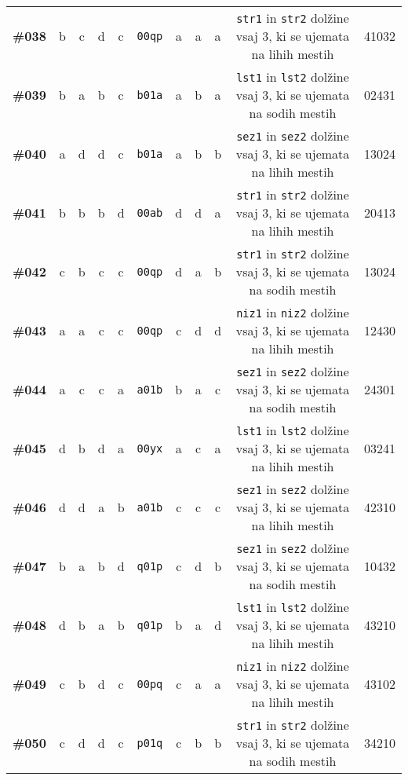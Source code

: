 \documentclass[arhiv, 10pt]{../izpit}
\newcommand{\inlinepy}[1]{\texttt{#1}}
\begin{document}
{\begin{tabular}{rcccccccccc}
\textbf{\#038} & b & c & d & c & \inlinepy{00qp} & a & a & a & 
        \inlinepy{str1} in \inlinepy{str2} dolžine vsaj 3, ki se ujemata na lihih mestih
     & 41032\\
\textbf{\#039} & b & a & b & c & \inlinepy{b01a} & a & b & a & 
        \inlinepy{lst1} in \inlinepy{lst2} dolžine vsaj 3, ki se ujemata na sodih mestih
     & 02431\\
\textbf{\#040} & a & d & d & c & \inlinepy{b01a} & a & b & b & 
        \inlinepy{sez1} in \inlinepy{sez2} dolžine vsaj 3, ki se ujemata na lihih mestih
     & 13024\\
\textbf{\#041} & b & b & b & d & \inlinepy{00ab} & d & d & a & 
        \inlinepy{str1} in \inlinepy{str2} dolžine vsaj 3, ki se ujemata na lihih mestih
     & 20413\\
\textbf{\#042} & c & b & c & c & \inlinepy{00qp} & d & a & b & 
        \inlinepy{str1} in \inlinepy{str2} dolžine vsaj 3, ki se ujemata na sodih mestih
     & 13024\\
\textbf{\#043} & a & a & c & c & \inlinepy{00qp} & c & d & d & 
        \inlinepy{niz1} in \inlinepy{niz2} dolžine vsaj 3, ki se ujemata na lihih mestih
     & 12430\\
\textbf{\#044} & a & c & c & a & \inlinepy{a01b} & b & a & c & 
        \inlinepy{sez1} in \inlinepy{sez2} dolžine vsaj 3, ki se ujemata na sodih mestih
     & 24301\\
\textbf{\#045} & d & b & d & a & \inlinepy{00yx} & a & c & a & 
        \inlinepy{lst1} in \inlinepy{lst2} dolžine vsaj 3, ki se ujemata na lihih mestih
     & 03241\\
\textbf{\#046} & d & d & a & b & \inlinepy{a01b} & c & c & c & 
        \inlinepy{sez1} in \inlinepy{sez2} dolžine vsaj 3, ki se ujemata na lihih mestih
     & 42310\\
\textbf{\#047} & b & a & b & d & \inlinepy{q01p} & c & d & b & 
        \inlinepy{sez1} in \inlinepy{sez2} dolžine vsaj 3, ki se ujemata na sodih mestih
     & 10432\\
\textbf{\#048} & d & b & a & b & \inlinepy{q01p} & b & a & d & 
        \inlinepy{lst1} in \inlinepy{lst2} dolžine vsaj 3, ki se ujemata na lihih mestih
     & 43210\\
\textbf{\#049} & c & b & d & c & \inlinepy{00pq} & c & a & a & 
        \inlinepy{niz1} in \inlinepy{niz2} dolžine vsaj 3, ki se ujemata na lihih mestih
     & 43102\\
\textbf{\#050} & c & d & d & c & \inlinepy{p01q} & c & b & b & 
        \inlinepy{str1} in \inlinepy{str2} dolžine vsaj 3, ki se ujemata na sodih mestih
     & 34210\\

            \bottomrule
            \end{tabular}}
            
\end{document}
